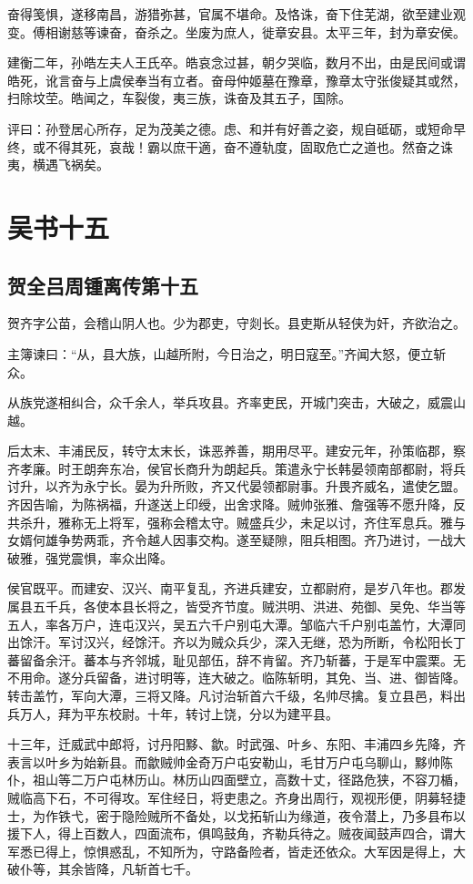 \documentclass[12pt,UTF8]{ctexbook}
\begin{document}
奋得笺惧，遂移南昌，游猎弥甚，官属不堪命。及恪诛，奋下住芜湖，欲至建业观变。傅相谢慈等谏奋，奋杀之。坐废为庶人，徙章安县。太平三年，封为章安侯。

建衡二年，孙皓左夫人王氏卒。皓哀念过甚，朝夕哭临，数月不出，由是民间或谓皓死，讹言奋与上虞侯奉当有立者。奋母仲姬墓在豫章，豫章太守张俊疑其或然，扫除坟茔。皓闻之，车裂俊，夷三族，诛奋及其五子，国除。

评曰：孙登居心所存，足为茂美之德。虑、和并有好善之姿，规自砥砺，或短命早终，或不得其死，哀哉！霸以庶干適，奋不遵轨度，固取危亡之道也。然奋之诛夷，横遇飞祸矣。

\part{吴书十五}
\chapter{贺全吕周锺离传第十五}

贺齐字公苗，会稽山阴人也。少为郡吏，守剡长。县吏斯从轻侠为奸，齐欲治之。

主簿谏曰：“从，县大族，山越所附，今日治之，明日寇至。”齐闻大怒，便立斩众。

从族党遂相纠合，众千余人，举兵攻县。齐率吏民，开城门突击，大破之，威震山越。

后太末、丰浦民反，转守太末长，诛恶养善，期用尽平。建安元年，孙策临郡，察齐孝廉。时王朗奔东冶，侯官长商升为朗起兵。策遣永宁长韩晏领南部都尉，将兵讨升，以齐为永宁长。晏为升所败，齐又代晏领都尉事。升畏齐威名，遣使乞盟。齐因告喻，为陈祸福，升遂送上印绶，出舍求降。贼帅张雅、詹强等不愿升降，反共杀升，雅称无上将军，强称会稽太守。贼盛兵少，未足以讨，齐住军息兵。雅与女婿何雄争势两乖，齐令越人因事交构。遂至疑隙，阻兵相图。齐乃进讨，一战大破雅，强党震惧，率众出降。

侯官既平。而建安、汉兴、南平复乱，齐进兵建安，立都尉府，是岁八年也。郡发属县五千兵，各使本县长将之，皆受齐节度。贼洪明、洪进、苑御、吴免、华当等五人，率各万户，连屯汉兴，吴五六千户别屯大潭。邹临六千户别屯盖竹，大潭同出馀汗。军讨汉兴，经馀汗。齐以为贼众兵少，深入无继，恐为所断，令松阳长丁蕃留备余汗。蕃本与齐邻城，耻见部伍，辞不肯留。齐乃斩蕃，于是军中震栗。无不用命。遂分兵留备，进讨明等，连大破之。临陈斩明，其免、当、进、御皆降。转击盖竹，军向大潭，三将又降。凡讨治斩首六千级，名帅尽擒。复立县邑，料出兵万人，拜为平东校尉。十年，转讨上饶，分以为建平县。

十三年，迁威武中郎将，讨丹阳黟、歙。时武强、叶乡、东阳、丰浦四乡先降，齐表言以叶乡为始新县。而歙贼帅金奇万户屯安勒山，毛甘万户屯乌聊山，黟帅陈仆，祖山等二万户屯林历山。林历山四面壁立，高数十丈，径路危狭，不容刀楯，贼临高下石，不可得攻。军住经日，将吏患之。齐身出周行，观视形便，阴募轻捷士，为作铁弋，密于隐险贼所不备处，以戈拓斩山为缘道，夜令潜上，乃多县布以援下人，得上百数人，四面流布，俱鸣鼓角，齐勒兵待之。贼夜闻鼓声四合，谓大军悉已得上，惊惧惑乱，不知所为，守路备险者，皆走还依众。大军因是得上，大破仆等，其余皆降，凡斩首七千。
\end{document}
